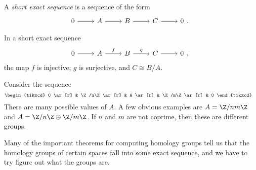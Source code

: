 \documentclass[a4paper]{article}
\begin{document}
\begin{defi}
  A \emph{short exact sequence} is a sequence of the form
  \[
    \begin{tikzcd}
      0 \ar[r] & A \ar[r] & B \ar[r] & C \ar[r] & 0
    \end{tikzcd}.
  \]
\end{defi}

\begin{lemma}
  In a short exact sequence
  \[
    \begin{tikzcd}
      0 \ar[r] & A \ar[r, "f"] & B \ar[r, "g"] & C \ar[r] & 0
    \end{tikzcd},
  \]
  the map $f$ is injective; $g$ is surjective, and $C \cong B/A$.
\end{lemma}

\begin{eg}
  Consider the sequence
  \[
    \begin{tikzcd}
      0 \ar[r] & \Z/n\Z \ar[r] & A \ar[r] & \Z/m\Z \ar[r] & 0
    \end{tikzcd}
  \]
  There are many possible values of $A$. A few obvious examples are $A = \Z/nm\Z$ and $A = \Z/n\Z \oplus \Z/m\Z$. If $n$ and $m$ are not coprime, then these are different groups.
\end{eg}
Many of the important theorems for computing homology groups tell us that the homology groups of certain spaces fall into some exact sequence, and we have to try figure out what the groups are.
\end{document}
